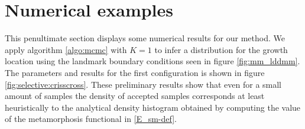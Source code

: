 \documentclass[runningheads]{llncs}
\begin{document}
\section{Numerical examples}\label{sec:numerical}

This penultimate section displays some numerical results for our method. We
apply algorithm \ref{algo:mcmc} with $K=1$ to infer a distribution for the
growth location using the landmark boundary conditions seen in figure
\ref{fig:mm_lddmm}. The parameters and results for the first configuration is
shown in figure \eqref{fig:selective:crisscross}. These preliminary results show
that even for a small amount of samples the density of accepted samples
corresponds at least heuristically to the analytical density histogram obtained
by computing the value of the metamorphosis functional in \eqref{E_sm-def}.\\
\end{document}
